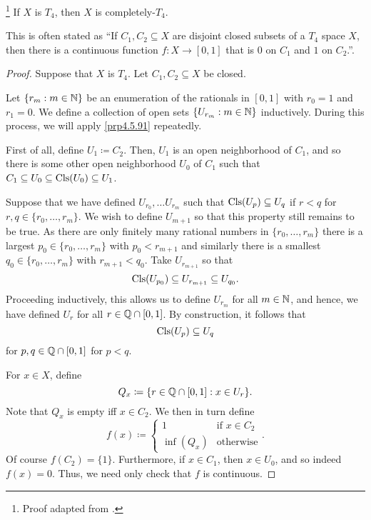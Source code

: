 \begin{thm}\footnote{Proof adapted from \cite[pg.~207]{Munkres}.}\label{UrysohnsLemma}
If $X$ is $T_4$, then $X$ is completely-$T_4$.
\begin{rmk}
This is often stated as ``If $C_1,C_2\subseteq X$ are disjoint closed subsets of a $T_4$ space $X$, then there is a continuous function $f:X\rightarrow [0,1]$ that is $0$ on $C_1$ and $1$ on $C_2$.''.
\end{rmk}
\begin{proof}
Suppose that $X$ is $T_4$.  Let $C_1,C_2\subseteq X$ be closed.

Let $\{ r_m:m\in \mathbb{N} \}$ be an enumeration of the rationals in $[0,1]$ with $r_0=1$ and $r_1=0$.  We define a collection of open sets $\{ U_{r_m}:m\in \mathbb{N} \}$ inductively.  During this process, we will apply \cref{prp4.5.91} repeatedly.

First of all, define $U_1\coloneqq C_2^{\comp}$.  Then, $U_1$ is an open neighborhood of $C_1$, and so there is some other open neighborhood $U_0$ of $C_1$ such that $C_1\subseteq U_0\subseteq \operatorname{Cls} (U_0)\subseteq U_1$.

Suppose that we have defined $U_{r_0},\ldots U_{r_m}$ such that $\operatorname{Cls} (U_p)\subseteq U_q$ if $r<q$ for $r,q\in \{ r_0,\ldots ,r_m\}$.  We wish to define $U_{m+1}$ so that this property still remains to be true.  As there are only finitely many rational numbers in $\{ r_0,\ldots ,r_m\}$ there is a largest $p_0\in \{ r_0,\ldots ,r_m\}$ with $p_0<r_{m+1}$ and similarly there is a smallest $q_0\in \{ r_0,\ldots ,r_m\}$ with $r_{m+1}<q_0$.  Take $U_{r_{m+1}}$ so that
\begin{equation}
\operatorname{Cls} (U_{p_0})\subseteq U_{r_{m+1}}\subseteq U_{q_0}.
\end{equation}
Proceeding inductively, this allows us to define $U_{r_m}$ for all $m\in \mathbb{N}$, and hence, we have defined $U_r$ for all $r\in \mathbb{Q} \cap [0,1]$.  By construction, it follows that
\begin{equation}
\operatorname{Cls} (U_p)\subseteq U_q
\end{equation}
for $p,q\in \mathbb{Q} \cap [0,1]$ for $p<q$.

For $x\in X$, define
\begin{equation}
Q_x\coloneqq \{ r\in \mathbb{Q} \cap [0,1]:x\in U_r\} .
\end{equation}
Note that $Q_x$ is empty iff $x\in C_2$.  We then in turn define
\begin{equation}
f(x)\coloneqq \begin{cases}1 & \text{if }x\in C_2 \\ \inf \left( Q_x\right) & \text{otherwise}\end{cases}.
\end{equation}
Of course $f(C_2)=\{ 1\}$.  Furthermore, if $x\in C_1$, then $x\in U_0$, and so indeed $f(x)=0$.  Thus, we need only check that $f$ is continuous.


\end{proof}
\end{thm}
